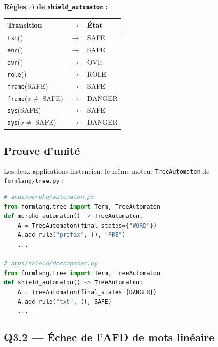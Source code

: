 \documentclass[12pt,a4paper,oneside]{scrartcl}
\begin{document}
\textbf{Règles $\Delta$ de \texttt{shield\_automaton} :}
\begin{center}
\begin{tabular}{lcl}
    \toprule
    \textbf{Transition} & $\to$ & \textbf{État} \\
    \midrule
    \texttt{txt}() & $\to$ & SAFE \\
    \texttt{enc}() & $\to$ & SAFE \\
    \texttt{ovr}() & $\to$ & OVR \\
    \texttt{role}() & $\to$ & ROLE \\
    \texttt{frame}(SAFE) & $\to$ & SAFE \\
    \texttt{frame}($x \neq$ SAFE) & $\to$ & DANGER \\
    \texttt{sys}(SAFE) & $\to$ & SAFE \\
    \texttt{sys}($x \neq$ SAFE) & $\to$ & DANGER \\
    \bottomrule
\end{tabular}
\end{center}

\subsection{Preuve d'unité}

Les deux applications instancient le même moteur \texttt{TreeAutomaton} de \texttt{formlang/tree.py} :
\begin{lstlisting}[language=Python]
# apps/morpho/automaton.py
from formlang.tree import Term, TreeAutomaton
def morpho_automaton() -> TreeAutomaton:
    A = TreeAutomaton(final_states={"WORD"})
    A.add_rule("prefix", (), "PRE")
    ...

# apps/shield/decomposer.py
from formlang.tree import Term, TreeAutomaton
def shield_automaton() -> TreeAutomaton:
    A = TreeAutomaton(final_states={DANGER})
    A.add_rule("txt", (), SAFE)
    ...
\end{lstlisting}

\subsection{Q3.2 — Échec de l'AFD de mots linéaire}
\end{document}
